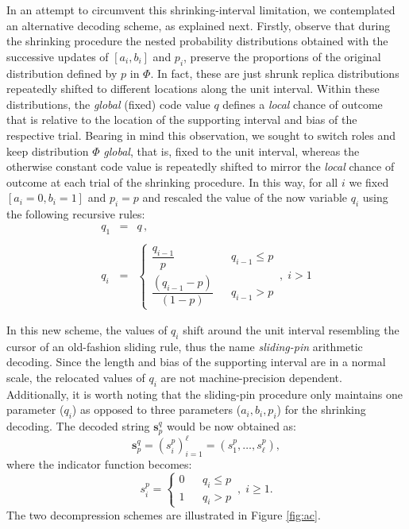 \documentclass{sig-alternate}
\newcommand{\bs}{{\mathbf s}}
\begin{document}
In an attempt to circumvent this shrinking-interval limitation, we contemplated an alternative decoding scheme, as explained next. Firstly, observe that during the shrinking procedure the nested probability distributions obtained with the successive updates of $[a_i, b_i]$ and $p_i$, preserve the proportions of the original distribution defined by $p$ in $\Phi$. In fact, these are just shrunk replica distributions repeatedly shifted to different locations along the unit interval. Within these distributions, the \emph{global} (fixed) code value $q$ defines a \emph{local} chance of outcome that is relative to the location of the supporting interval and bias of the respective trial. Bearing in mind this observation, we sought to switch roles and keep distribution $\Phi$ \emph{global}, that is, fixed to the unit interval, whereas the otherwise constant code value is repeatedly shifted to mirror the \emph{local} chance of outcome at each trial of the shrinking procedure. In this way, for all $i$ we fixed $[a_i=0, b_i=1]$ and $p_i=p$ and rescaled the value of the now variable $q_i$ using the following recursive rules:
\begin{equation}
\begin{array}{lll} q_1 &=& q \,,\\ &&\\
q_i &=& \left\{ \begin{matrix} \dfrac{q_{i-1}}{p} && q_{i-1} \le p \\ 
\dfrac{(q_{i-1}-p)}{(1-p)} && q_{i-1} > p \end{matrix} \,,\; i>1 \right.
\end{array} \label{eq:qi}
\end{equation} 

In this new scheme, the values of $q_i$ shift around the unit interval resembling the cursor of an old-fashion sliding rule, thus the name \emph{sliding-pin} arithmetic decoding. Since the length and bias of the supporting interval are in a normal scale, the relocated values of $q_i$ are not machine-precision dependent. Additionally, it is worth noting that the sliding-pin procedure only maintains one parameter ($q_i$) as opposed to three parameters ($a_i,b_i,p_i$) for the shrinking decoding. The decoded string $\bs_p^q$ would be now obtained as:
\begin{equation}
\bs_p^q = (s_i^p)_{i=1}^\ell = (s_1^p, \ldots, s_\ell^p), \label{eq:spq}
\end{equation}
where the indicator function becomes: 
\begin{equation}
s_i^p= \left\{\begin{matrix} 0&& q_i \le p \\ 1&& q_i > p \end{matrix} \right. \,,\; i \ge 1. \label{eq:sqi}
\end{equation}
The two decompression schemes are illustrated in Figure \ref{fig:ac}.
\end{document}
